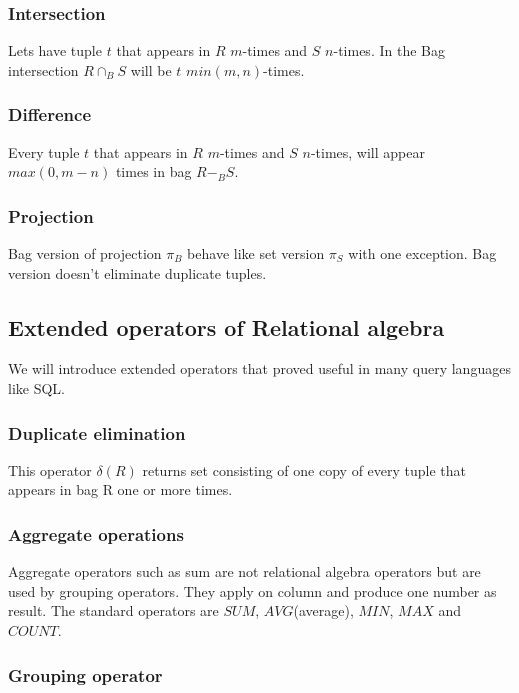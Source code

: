 \subsubsection{Intersection}

Lets have tuple $t$ that appears in $R$ $m$-times and $S$ $n$-times. In the Bag intersection $R \cap_B S$ will be $t$ $min(m,n)$-times.

\subsubsection{Difference}
Every tuple $t$ that appears in $R$ $m$-times and $S$ $n$-times, will appear $max(0,m-n)$ times in bag $R-_B S$.

\subsubsection{Projection}
Bag version of projection $\pi_B$ behave like set version $\pi_S$ with one exception. Bag version doesn't eliminate duplicate tuples.

\subsection{Extended operators of Relational algebra}

We will introduce extended operators that proved useful in many query languages like SQL.


\subsubsection{Duplicate elimination}
This operator $\delta(R)$ returns set consisting of one copy of every tuple that appears in bag R one or more times.

\subsubsection{Aggregate operations}

Aggregate operators such as sum are not relational algebra operators but are used by grouping operators. They apply on column and produce one number as result. The standard operators are $SUM$, $AVG$(average), $MIN$, $MAX$ and $COUNT$.


\subsubsection{Grouping operator}

